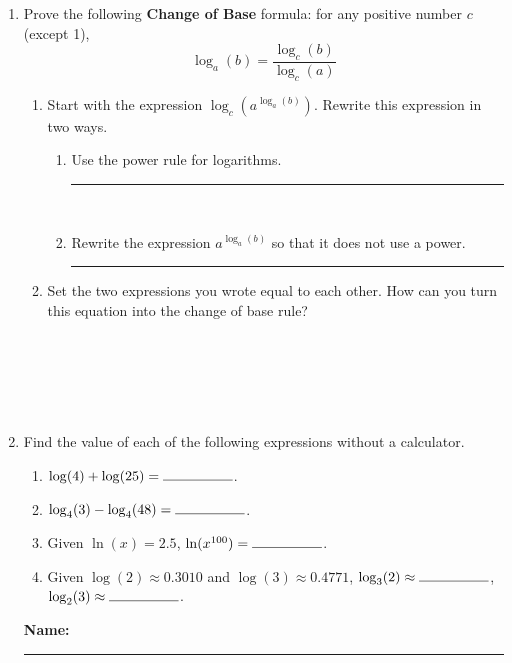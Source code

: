 \documentclass[twoside, 10pt]{article}
\begin{document}
\begin{enumerate}
\item 
Prove the following {\bf Change of Base} formula: for any positive number $c$ (except 1),
\[
\log_a(b) = \frac{\log_c(b)}{\log_c(a)}
\]
\begin{enumerate}
\item
Start with the expression $\displaystyle \log_c(a^{\log_a(b)})$. Rewrite this expression in two ways.\\[1em]
\begin{enumerate}
\item
Use the power rule for logarithms. \rule{20em}{0.4pt}\\[1em]
\item Rewrite the expression $\displaystyle a^{\log_a(b)}$ so that it does not use a power.  \rule{15em}{0.4pt}
\end{enumerate}
\item Set the two expressions you wrote equal to each other. How can you turn this equation
into the change of base rule?\\[1em]

\hrulefill\\[1em]

\hrulefill\\[1em]

\hrulefill\\[1em]

\hrulefill\\[1em]

\hrulefill\\[1em]

\end{enumerate}

\item Find the value of each of the following expressions without a calculator.
\begin{enumerate}[itemsep=2em]
\item
$\log(4) + \log(25) = \rule{5em}{.4pt}$.

\item
$\log_4(3) - \log_4(48) = \rule{5em}{.4pt}$.

\item Given $\ln(x) = 2.5$, $\ln(x^{100}) =  \rule{5em}{.4pt}$.
\item Given $\log(2) \approx 0.3010$ and $\log(3) \approx 0.4771 $, $\log_3(2) \approx \rule{5em}{.4pt}$, $\log_2(3) \approx \rule{5em}{.4pt}$.
\end{enumerate}
\clearpage

\textbf{Name:} \rule{20em}{0.4pt}


\end{enumerate}
\end{document}
